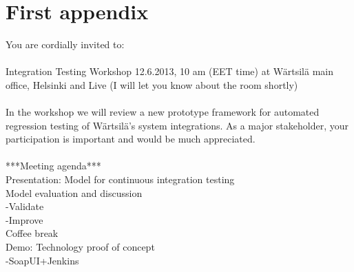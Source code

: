 \documentclass[12pt,a4paper,oneside,pdftex]{report}
\begin{document}
{%


%  
 

\appendix
% 

\chapter{First appendix}
\label{chapter:first-appendix}

\begin{tt}
You are cordially invited to: \\
\\
Integration Testing Workshop 
12.6.2013, 10 am (EET time) at Wärtsilä main office, Helsinki and Live (I will let you know about the room shortly) \\
\\
In the workshop we will review a new prototype framework for automated regression testing of Wärtsilä's system integrations. As a major stakeholder, your participation is important and would be much appreciated. \\
\\
***Meeting agenda*** \\

Presentation: Model for continuous integration testing \\             

Model evaluation and discussion \\
-Validate \\
-Improve
\\

Coffee break \\

Demo: Technology proof of concept \\
-SoapUI+Jenkins
\\


\end{tt}}
\end{document}
